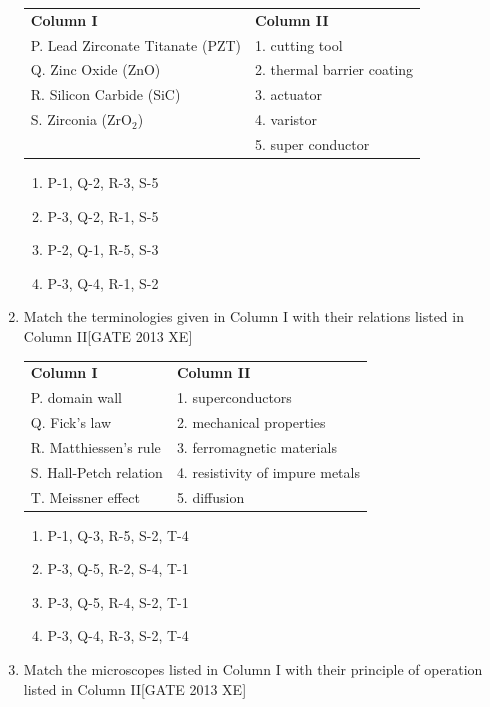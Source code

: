 \documentclass[journal,12pt,onecolumn]{IEEEtran}
\theoremstyle{remark}
\begin{document}
\begin{enumerate}
\begin{tabular}{ll}
\textbf{Column I} & \textbf{Column II} \\
P. Lead Zirconate Titanate (PZT) & 1. cutting tool \\
Q. Zinc Oxide (ZnO) & 2. thermal barrier coating \\
R. Silicon Carbide (SiC) & 3. actuator \\
S. Zirconia (ZrO$_2$) & 4. varistor \\
& 5. super conductor \\
\end{tabular}

\begin{enumerate}
\item P-1, Q-2, R-3, S-5
\item P-3, Q-2, R-1, S-5
\item P-2, Q-1, R-5, S-3
\item P-3, Q-4, R-1, S-2
\end{enumerate}



\item Match the terminologies given in Column I with their relations listed in Column II\hfill[GATE 2013 XE]

\begin{tabular}{ll}
\textbf{Column I} & \textbf{Column II} \\
P. domain wall & 1. superconductors \\
Q. Fick's law & 2. mechanical properties \\
R. Matthiessen's rule & 3. ferromagnetic materials \\
S. Hall-Petch relation & 4. resistivity of impure metals \\
T. Meissner effect & 5. diffusion \\
\end{tabular}

\begin{enumerate}
\item P-1, Q-3, R-5, S-2, T-4
\item P-3, Q-5, R-2, S-4, T-1
\item P-3, Q-5, R-4, S-2, T-1
\item P-3, Q-4, R-3, S-2, T-4
\end{enumerate}



\item Match the microscopes listed in Column I with their principle of operation listed in Column II\hfill[GATE 2013 XE]


\end{enumerate}
\end{document}
